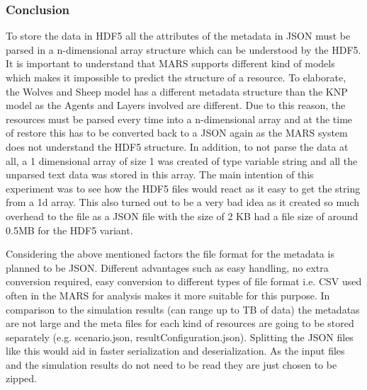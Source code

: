 \subsubsection{Conclusion}
    To store the data in HDF5 all the attributes of the metadata in JSON must be parsed in a n-dimensional array structure which can be understood by the HDF5. 
    It is important to understand that MARS supports different kind of models which makes it impossible to predict the structure of a resource. To elaborate, the
    Wolves and Sheep \cite{HAWHamburgMARS} model has a different metadata structure than the KNP \cite{HAWHamburgMARS} model as the Agents and Layers involved are 
    different. Due to this reason, the resources
    must be parsed every time into a n-dimensional array and at the time of restore this has to be converted back to a JSON again as the MARS system
    does not understand the HDF5 structure. In addition, to not parse the data at all, a 1 dimensional array of size 1 was created of type variable string and all the unparsed text data
    was stored in this array. The main intention of this experiment was to see how the HDF5 files would react as it easy to get the string from a 1d array.
    This also turned out to be a very bad idea as it created so much overhead to the file as a JSON file with the size of 2 KB
    had a file size of around 0.5MB for the HDF5 variant. 
    
    Considering the above mentioned factors the file format for the metadata is planned to be JSON. Different advantages such as easy handling, no extra conversion
    required, easy conversion to different types of file format i.e. CSV used often in the MARS for analysis makes it more suitable for this purpose. 
    In comparison to the simulation results (can range up to TB of data) the metadatas are not large and the meta files for each kind of resources
    are going to be stored separately (e.g. scenario.json, resultConfiguration.json). Splitting the JSON files like this would aid in faster serialization and 
    deserialization. As the input files and the simulation results do not need to be read they are just chosen to be zipped.
 
